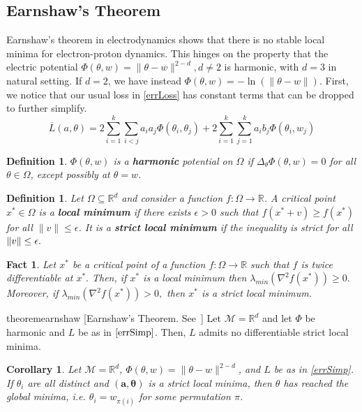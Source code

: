 \documentclass{article}
\newtheorem{fact}[theorem]{Fact}
\newtheorem{corollary}[theorem]{Corollary}
\newtheorem{definition}[theorem]{Definition}
\newcommand{\R}{{\mathbb{R}}}
\begin{document}
\subsection{Earnshaw's Theorem}
%
Earnshaw's theorem in electrodynamics shows that there is no stable local minima for electron-proton dynamics. This hinges on the property that the electric potential $\Phi(\theta,w) = \|\theta-w\|^{2-d}, d \neq 2$ is harmonic, with $d = 3$ in natural setting. If $d = 2$, we have instead $\Phi(\theta, w) = - \ln(\|\theta - w\|)$. First, we notice that our usual loss in \eqref{errLoss} has constant terms that can be dropped to further simplify.
%
\begin{equation}\label{errSimp}
\overline{L}(a,\theta) =  2\sum_{i=1}^k\sum_{i < j} a_ia_j\Phi(\theta_i,\theta_j) + 2\sum_{i=1}^k\sum_{j=1}^ka_ib_j \Phi(\theta_i,w_j)
\end{equation} 
%
\begin{definition}
$\Phi(\theta,w)$ is a {\bf harmonic} potential on $\Omega$ if $\Delta_\theta \Phi(\theta,w) = 0$ for all $\theta \in \Omega$, except possibly at $\theta = w$.
\end{definition}

\begin{definition}
  Let $\Omega \subseteq \R^d$ and consider a function
  $f:\Omega \to \R$. A critical point $x^* \in \Omega$ is a {\bf local
    minimum} if there exists $\epsilon > 0$ such that
  $f(x^*+v) \geq f(x^*)$ for all $\|v\|\leq \epsilon$. It is a {\bf
    strict local minimum} if the inequality is strict for all
  $\left\lVert v \right\rVert \le \epsilon.$
\end{definition} 
%
\begin{fact}
  Let $x^*$ be a critical point of a function $f : \Omega \to \R$ such
  that $f$ is twice differentiable at $x^*.$ Then, if $x^*$ is a local
  minimum then $\lambda_{min}(\nabla^2 f(x^*)) \geq 0.$ Moreover, if
  $\lambda_{min}(\nabla^2 f(x^*)) > 0,$ then $x^*$ is a strict local minimum.
\end{fact}
%
\begin{restatable}{theorem}{earnshaw}
[Earnshaw's Theorem. See~\cite{arnold1985mathematical}]
\label{Earnshaw} 
Let $\mathcal{M} = \R^d$ and let $\Phi$ be harmonic and $L$
be as in $\eqref{errSimp}$. Then, $L$ admits no
differentiable strict local minima.
\end{restatable}
%


\begin{corollary}
Let $\mathcal{M} = \R^d$, $\Phi(\theta,w) = \|\theta-w\|^{2-d}$, and $L$ be as in \eqref{errSimp}. If $\theta_i$ are all distinct and $(\boldsymbol{a,\theta})$ is a strict local minima, then $\theta$ has reached the global minima, i.e. $\theta_i = w_{\pi(i)}$ for some permutation $\pi$. 
\end{corollary}
\fi
\end{document}
